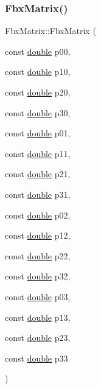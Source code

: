 \subsubsection{\texorpdfstring{Fbx\+Matrix()}{FbxMatrix()}\hspace{0.1cm}{\footnotesize\ttfamily [6/6]}}
{\footnotesize\ttfamily Fbx\+Matrix\+::\+Fbx\+Matrix (\begin{DoxyParamCaption}\item[{const \hyperlink{class_fbx_matrix_a01f8be57393e5d9973b23897c29d5520}{double}}]{p00,  }\item[{const \hyperlink{class_fbx_matrix_a01f8be57393e5d9973b23897c29d5520}{double}}]{p10,  }\item[{const \hyperlink{class_fbx_matrix_a01f8be57393e5d9973b23897c29d5520}{double}}]{p20,  }\item[{const \hyperlink{class_fbx_matrix_a01f8be57393e5d9973b23897c29d5520}{double}}]{p30,  }\item[{const \hyperlink{class_fbx_matrix_a01f8be57393e5d9973b23897c29d5520}{double}}]{p01,  }\item[{const \hyperlink{class_fbx_matrix_a01f8be57393e5d9973b23897c29d5520}{double}}]{p11,  }\item[{const \hyperlink{class_fbx_matrix_a01f8be57393e5d9973b23897c29d5520}{double}}]{p21,  }\item[{const \hyperlink{class_fbx_matrix_a01f8be57393e5d9973b23897c29d5520}{double}}]{p31,  }\item[{const \hyperlink{class_fbx_matrix_a01f8be57393e5d9973b23897c29d5520}{double}}]{p02,  }\item[{const \hyperlink{class_fbx_matrix_a01f8be57393e5d9973b23897c29d5520}{double}}]{p12,  }\item[{const \hyperlink{class_fbx_matrix_a01f8be57393e5d9973b23897c29d5520}{double}}]{p22,  }\item[{const \hyperlink{class_fbx_matrix_a01f8be57393e5d9973b23897c29d5520}{double}}]{p32,  }\item[{const \hyperlink{class_fbx_matrix_a01f8be57393e5d9973b23897c29d5520}{double}}]{p03,  }\item[{const \hyperlink{class_fbx_matrix_a01f8be57393e5d9973b23897c29d5520}{double}}]{p13,  }\item[{const \hyperlink{class_fbx_matrix_a01f8be57393e5d9973b23897c29d5520}{double}}]{p23,  }\item[{const \hyperlink{class_fbx_matrix_a01f8be57393e5d9973b23897c29d5520}{double}}]{p33 }\end{DoxyParamCaption})}

